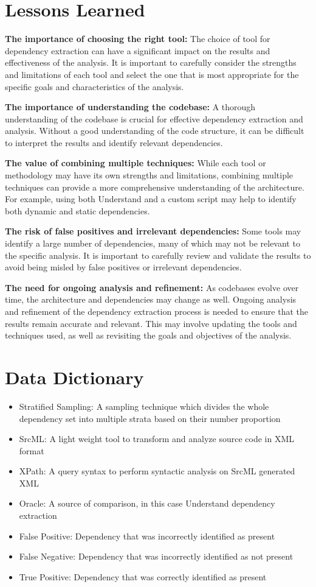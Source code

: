 \documentclass[12pt, dvipsnames, a4paper]{article}
\begin{document}
\section{Lessons Learned}
\textbf{The importance of choosing the right tool:} The choice of tool for dependency extraction can have a significant impact on the results and effectiveness of the analysis. It is important to carefully consider the strengths and limitations of each tool and select the one that is most appropriate for the specific goals and characteristics of the analysis.

\textbf{The importance of understanding the codebase:} A thorough understanding of the codebase is crucial for effective dependency extraction and analysis. Without a good understanding of the code structure, it can be difficult to interpret the results and identify relevant dependencies.

\textbf{The value of combining multiple techniques:} While each tool or methodology may have its own strengths and limitations, combining multiple techniques can provide a more comprehensive understanding of the architecture. For example, using both Understand and a custom script may help to identify both dynamic and static dependencies.

\textbf{The risk of false positives and irrelevant dependencies:} Some tools may identify a large number of dependencies, many of which may not be relevant to the specific analysis. It is important to carefully review and validate the results to avoid being misled by false positives or irrelevant dependencies.

\textbf{The need for ongoing analysis and refinement:} As codebases evolve over time, the architecture and dependencies may change as well. Ongoing analysis and refinement of the dependency extraction process is needed to ensure that the results remain accurate and relevant. This may involve updating the tools and techniques used, as well as revisiting the goals and objectives of the analysis.
\clearpage
\section{Data Dictionary}
\begin{itemize}
	\item{Stratified Sampling: A sampling technique which divides the whole dependency set into multiple strata based on their number proportion}
	\item {SrcML: A light weight tool to transform and analyze source code in XML format}
	\item {XPath: A query syntax to perform syntactic analysis on SrcML generated XML}
	\item {Oracle: A source of comparison, in this case Understand dependency extraction}
	\item {False Positive: Dependency that was incorrectly identified as present}
	\item {False Negative: Dependency that was incorrectly identified as not present}
	\item {True Positive: Dependency that was correctly identified as present}
\end{itemize}
\end{document}
